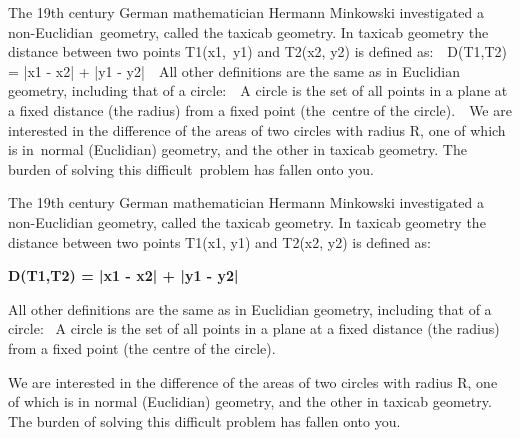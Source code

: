 The 19th century German mathematician Hermann Minkowski investigated a non-Euclidian geometry, called the taxicab geometry. In taxicab geometry the distance between two points T1(x1, y1) and T2(x2, y2) is defined as:  D(T1,T2) = |x1 - x2| + |y1 - y2|  All other definitions are the same as in Euclidian geometry, including that of a circle:  A circle is the set of all points in a plane at a fixed distance (the radius) from a fixed point (the centre of the circle).  We are interested in the difference of the areas of two circles with radius R, one of which is in normal (Euclidian) geometry, and the other in taxicab geometry. The burden of solving this difficult problem has fallen onto you.

The 19th century German mathematician Hermann Minkowski investigated a non-Euclidian geometry, called the taxicab geometry. In taxicab geometry the distance between two points T1(x1, y1) and T2(x2, y2) is defined as:

\textbf{D(T1,T2) = |x1 - x2| + |y1 - y2|  }

All other definitions are the same as in Euclidian geometry, including that of a circle:  A circle is the set of all points in a plane at a fixed distance (the radius) from a fixed point (the centre of the circle).

We are interested in the difference of the areas of two circles with radius R, one of which is in normal (Euclidian) geometry, and the other in taxicab geometry. The burden of solving this difficult problem has fallen onto you.
